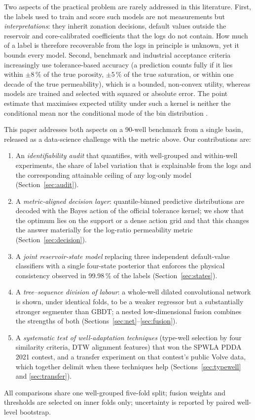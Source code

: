\documentclass[preprint,12pt]{elsarticle}
\begin{document}
Two aspects of the practical problem are rarely addressed in this literature. First, the labels used to train and score such models are not measurements but \emph{interpretations}: they inherit zonation decisions, default values outside the reservoir and core-calibrated coefficients that the logs do not contain. How much of a label is therefore recoverable from the logs in principle is unknown, yet it bounds every model. Second, benchmark and industrial acceptance criteria increasingly use tolerance-based accuracy (a prediction counts fully if it lies within $\pm 8\,\%$ of the true porosity, $\pm 5\,\%$ of the true saturation, or within one decade of the true permeability), which is a bounded, non-convex utility, whereas models are trained and selected with squared or absolute error. The point estimate that maximises expected utility under such a kernel is neither the conditional mean nor the conditional mode of the bin distribution \cite{berger1985}.

This paper addresses both aspects on a 90-well benchmark from a single basin, released as a data-science challenge with the metric above. Our contributions are:
\begin{enumerate}
\item An \emph{identifiability audit} that quantifies, with well-grouped and within-well experiments, the share of label variation that is explainable from the logs and the corresponding attainable ceiling of any log-only model (Section~\ref{sec:audit}).
\item A \emph{metric-aligned decision layer}: quantile-binned predictive distributions are decoded with the Bayes action of the official tolerance kernel; we show that the optimum lies on the support or a dense action grid and that this changes the answer materially for the log-ratio permeability metric (Section~\ref{sec:decision}).
\item A \emph{joint reservoir-state model} replacing three independent default-value classifiers with a single four-state posterior that enforces the physical consistency observed in 99.98\,\% of the labels (Section~\ref{sec:states}).
\item A \emph{tree--sequence division of labour}: a whole-well dilated convolutional network is shown, under identical folds, to be a weaker regressor but a substantially stronger segmenter than GBDT; a nested low-dimensional fusion combines the strengths of both (Sections~\ref{sec:net}--\ref{sec:fusion}).
\item A \emph{systematic test of well-adaptation techniques} (type-well selection by four similarity criteria, DTW alignment features) that won the SPWLA PDDA 2021 contest, and a transfer experiment on that contest's public Volve data, which together delimit when these techniques help (Sections~\ref{sec:typewell} and \ref{sec:transfer}).
\end{enumerate}
All comparisons share one well-grouped five-fold split; fusion weights and thresholds are selected on inner folds only; uncertainty is reported by paired well-level bootstrap.
\end{document}
